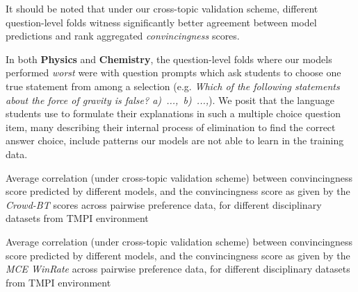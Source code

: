 \documentclass[notitlepage,12pt]{jedm}
\begin{document}
It should be noted that under our cross-topic validation scheme, different 
question-level folds witness significantly better agreement between model 
predictions and rank aggregated \textit{convincingness} scores.

In both \textbf{Physics} and \textbf{Chemistry}, the question-level folds where 
our models performed \textit{worst} were with question prompts which ask 
students to choose one true statement from among a selection (e.g. 
\textit{Which of the following statements about the force of gravity is 
false? \mbox{a) ..., b) ...,}}).
We posit that the language students use to formulate their explanations in such 
a multiple choice question item, many describing their internal process of 
elimination to find the correct answer choice, include patterns our models are 
not able to learn in the training data.

\begin{table}
	\caption{
	Average correlation (under cross-topic validation scheme) between 
	convincingness score predicted by different models, and the 
	convincingness score as given by the \textit{Crowd-BT} scores across 
	pairwise preference data, for different disciplinary datasets from TMPI 
	environment
	}
	\label{tab:dalite_crowdBT}
	\parbox{.45\linewidth}{
		\centering
		
	}
	\hfill
	\parbox{.45\linewidth}{
		\centering
		
	}

\end{table}

\begin{table}
	\caption{
	Average correlation (under cross-topic validation scheme) between 
	convincingness score predicted by different models, and the 
	convincingness score as given by the \textit{MCE WinRate} across 
	pairwise preference data, for different disciplinary datasets from TMPI 
	environment
	}
	\label{tab:dalite_winrate_nopairs}
	\parbox{.45\linewidth}{
		\centering
		
	}
	\hfill
	\parbox{.45\linewidth}{
	\centering
		
	}
\end{table}
\end{document}
